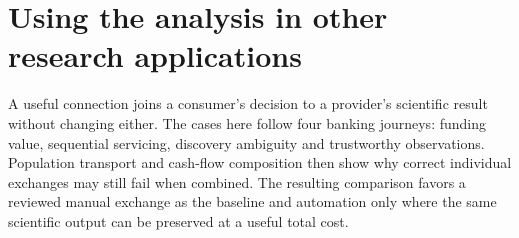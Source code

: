 \chapter{Using the analysis in other research applications}
\label{in:consumers}
\label{exec13:i3-start}

A useful connection joins a consumer's decision to a provider's scientific result without changing either. The cases here follow four banking journeys: funding value, sequential servicing, discovery ambiguity and trustworthy observations. Population transport and cash-flow composition then show why correct individual exchanges may still fail when combined. The resulting comparison favors a reviewed manual exchange as the baseline and automation only where the same scientific output can be preserved at a useful total cost.





\label{exec13:i3-end}
